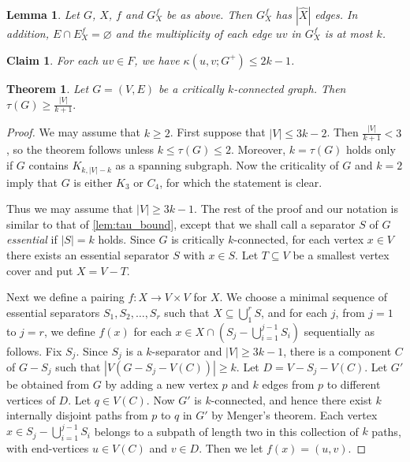\documentclass[10pt,a4paper]{amsart}
\newtheorem{theorem}{Theorem}
\newtheorem{lemma}{Lemma}
\newtheorem{claim}{Claim}
\begin{document}
\begin{lemma}\label{cl}
    Let $G$, $\hat X$, $f$ and $G^f_X$ be as above. Then $G^f_X$ has $|\hat X|$ edges. In addition,
$E\cap E^f_X=\varnothing$
    and
    the multiplicity of each edge
$uv$ in $G^f_X$ is at most $k$.
\end{lemma}

\begin{claim}\label{cl2}
    For each $uv\in F$, we have $\kappa(u,v;G^+)\leq 2k-1$.
\end{claim}

\begin{theorem}\label{lem:tau_bound2}
    Let $G=(V,E)$ be a critically $k$-connected graph. Then $\tau(G)\geq \frac{|V|}{k+1}.$
\end{theorem}

\begin{proof}
We may assume that $k\geq 2$. First suppose that $|V|\leq 3k-2$.
Then $\frac{|V|}{k+1}<3$, so the theorem follows unless $k\leq \tau(G)\leq 2$.
Moreover, $k=\tau(G)$ holds only if $G$ contains $K_{k,|V|-k}$ as a spanning subgraph. Now the criticality of $G$ and $k=2$ imply that $G$ is 
either $K_3$ or $C_4$, for which the statement is clear.

Thus we may assume that $|V|\geq 3k-1$. The rest of the proof and 
our notation is similar to
that of \cref{lem:tau_bound}, except that 
we shall call a separator $S$ of $G$ 
{\itshape essential} if $|S|=k$ holds. 
Since $G$ is critically $k$-connected, for each vertex
$x\in V$ there exists an essential separator  $S$ with $x\in S$. 
Let $T\subseteq V$ be a smallest vertex cover and 
put $X=V-T$.

Next we define a pairing $f:X\to V\times V$ for $X$.
We choose a minimal sequence of essential separators $S_1,S_2,\dots,S_r$ such that
$X\subseteq \bigcup_1^r S$, and for each $j$, from $j=1$ to $j=r$,
we define $f(x)$ for
each $x\in X\cap (S_j-\bigcup_{i=1}^{j-1} S_i)$ sequentially as follows.
Fix $S_j$.
Since $S_j$
is a $k$-separator and $|V|\geq 3k-1$, there is a component $C$ of $G-S_j$
such that $|V(G-S_j-V(C))|\geq k.$ Let $D=V-S_j-V(C)$.
Let $G'$ be obtained from $G$ by
adding a new vertex $p$ and $k$ edges from $p$ to different vertices of $D$.
Let $q\in V(C)$. Now $G'$ is $k$-connected, and hence there exist $k$
internally disjoint paths from $p$ to $q$ in $G'$ by Menger's theorem.
Each vertex $x\in S_j-\bigcup_{i=1}^{j-1} S_i$ belongs to a subpath of length two in this collection
of $k$ paths, with end-vertices $u\in V(C)$ and $v\in D$.
Then we let $f(x)=(u,v)$.


\end{proof}
\end{document}
